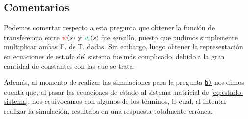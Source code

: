 \subsection{Comentarios}

Podemos comentar respecto a esta pregunta que obtener la función de transferencia
entre $\mathbin{\color{red}\psi}(s)$ y $\verd{v_{i}}(s)$ fue sencillo, puesto que pudimos
simplemente multiplicar ambas F. de T. dadas. Sin embargo, luego obtener la
representación en ecuaciones de estado del sistema fue más complicado, debido
a la gran cantidad de constantes con las que se trata.

Además, al momento de realizar las simulaciones para la pregunta \hyperref[pregunta-b]{\texttt{b)}}
nos dimos cuenta que, al pasar las ecuaciones de estado al sistema matricial de
\eqref{eq:estado-sistema}, nos equivocamos con algunos de los términos, lo cual,
al intentar realizar la simulación, resultaba en una respuesta totalmente errónea.
